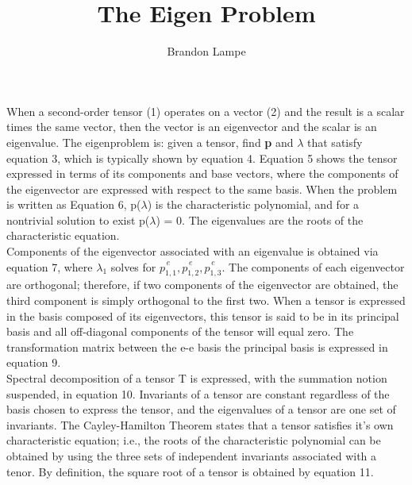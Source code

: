 \documentclass[10pt, letterpaper]{article}
\begin{document}
 
\title{The Eigen Problem}
\author{Brandon Lampe}
\maketitle

When a second-order tensor (1) operates on a vector (2) and the result is a scalar times the same vector, then the vector is an eigenvector and the scalar is an eigenvalue.  The eigenproblem is: given a tensor, find \textbf{p} and $\lambda$ that satisfy equation 3, which is typically shown by equation 4.  Equation 5 shows the tensor expressed in terms of its components and base vectors, where the components of the eigenvector are expressed with respect to the same basis.  When the problem is written as Equation 6, p($\lambda$) is the characteristic polynomial, and for a nontrivial solution to exist  p($\lambda$) = 0.  The eigenvalues are the roots of the characteristic equation.\\

Components of the eigenvector associated with an eigenvalue is obtained via equation 7, where $\lambda_1$ solves for $\overset{e}{p_{1,1}}, \overset{e}{p_{1,2}}, \overset{e}{p_{1,3}}$.  The components of each eigenvector are orthogonal; therefore, if two components of the eigenvector are obtained, the third component is simply orthogonal to the first two.  When a tensor is expressed in the basis composed of its eigenvectors, this tensor is said to be in its principal basis and all off-diagonal components of the tensor will equal zero.  The transformation matrix between the e-e basis the principal basis is expressed in equation 9.\\

Spectral decomposition of a tensor T is expressed, with the summation notion suspended, in equation 10.  Invariants of a tensor are constant regardless of the basis chosen to express the tensor, and the eigenvalues of a tensor are one set of invariants.  The Cayley-Hamilton Theorem states that a tensor satisfies it's own characteristic equation; i.e., the roots of the characteristic polynomial can be obtained by using the three sets of independent invariants associated with a tenor.  By definition, the square root of a tensor is obtained by equation 11.\\
\end{document}
